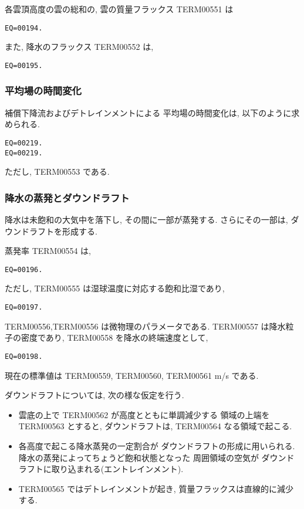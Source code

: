 各雲頂高度の雲の総和の, 
雲の質量フラックス TERM00551 は
\begin{verbatim}
EQ=00194.
\end{verbatim}

また, 降水のフラックス TERM00552 は,
\begin{verbatim}
EQ=00195.
\end{verbatim}

\subsubsection{平均場の時間変化}

補償下降流およびデトレインメントによる
平均場の時間変化は, 以下のように求められる.
\begin{verbatim}
EQ=00219.
EQ=00219.
\end{verbatim}
ただし, TERM00553 である.

\subsubsection{降水の蒸発とダウンドラフト}

降水は未飽和の大気中を落下し, その間に一部が蒸発する.
さらにその一部は, ダウンドラフトを形成する.

蒸発率 TERM00554 は,
\begin{verbatim}
EQ=00196.
\end{verbatim}
ただし, TERM00555 は湿球温度に対応する飽和比湿であり,
\begin{verbatim}
EQ=00197.
\end{verbatim}
TERM00556,TERM00556 は微物理のパラメータである.
TERM00557 は降水粒子の密度であり, TERM00558 を降水の終端速度として,
\begin{verbatim}
EQ=00198.
\end{verbatim}
現在の標準値は TERM00559, TERM00560, TERM00561 m/s である.

ダウンドラフトについては, 次の様な仮定を行う.
\begin{itemize}
\item 雲底の上で TERM00562 が高度とともに単調減少する
      領域の上端を TERM00563 とすると, ダウンドラフトは,
      TERM00564 なる領域で起こる.
\item 各高度で起こる降水蒸発の一定割合が
      ダウンドラフトの形成に用いられる.
      降水の蒸発によってちょうど飽和状態となった
      周囲領域の空気が
      ダウンドラフトに取り込まれる(エントレインメント).
\item TERM00565 ではデトレインメントが起き,
      質量フラックスは直線的に減少する.
\end{itemize}

